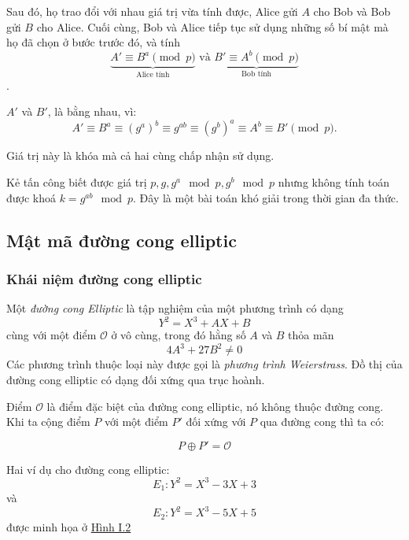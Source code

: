 Sau đó, họ trao đổi với nhau giá trị vừa tính được, Alice gửi $A$ cho Bob và Bob gửi $B$ cho Alice. 
Cuối cùng, Bob và Alice tiếp tục sử dụng những số bí mật mà họ đã chọn ở bước trước đó, và tính
$$\underbrace{A' \equiv B^a \pmod{p}}_{\text{Alice tính}} \text{ và } \underbrace{B' \equiv A^b \pmod{p}}_{\text{Bob tính}}$$.

$A'$ và $B'$, là bằng nhau, vì:
$$A' \equiv B^a \equiv (g^a)^b \equiv g^{ab} \equiv (g^b)^a \equiv A^b \equiv B' \pmod{p}.$$

Giá trị này là khóa mà cả hai cùng chấp nhận sử dụng.

Kẻ tấn công biết được giá trị $p,g,g^a \mod p, g^b \mod p $ nhưng không 
tính toán được khoá $k = g^{ab} \mod p$. Đây là một bài toán khó giải 
trong thời gian đa thức. \cite{Diffie_Hellman}

\subsection{Mật mã đường cong elliptic}
\subsubsection{Khái niệm đường cong elliptic}

Một \textit{đường cong Elliptic} là tập nghiệm của một phương trình có dạng
$$Y^2 = X^3 + AX + B$$ cùng với một điểm $\mathcal{O}$ ở vô cùng, trong đó hằng số $A$ và $B$ thỏa mãn
$$ 4A^3 + 27B^2 \neq 0$$
Các phương trình thuộc loại này được gọi là \textit{phương trình Weierstrass}. 
Đồ thị của đường cong elliptic có dạng đối xứng qua trục hoành. \cite{Elliptic_Curve}

Điểm $\mathcal{O}$ là điểm đặc biệt của đường cong elliptic, nó không thuộc đường cong.
Khi ta cộng điểm $P$ với một điểm $P'$ đối xứng với $P$ qua đường cong thì ta có:

$$ P \oplus P' = \mathcal{O}$$

Hai ví dụ cho đường cong elliptic:
$$ E_1: Y^2=X^3-3X+3 $$ và $$ E_2: Y^2=X^3-5X+5 $$ được minh họa ở \hyperref[fg:fg1]{Hình I.2}

